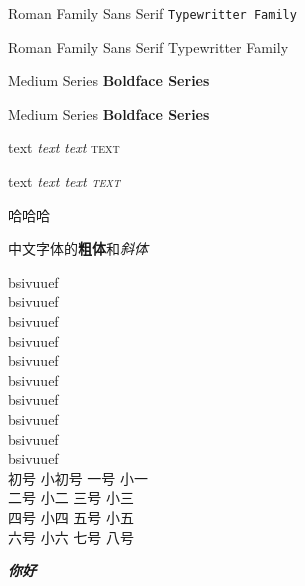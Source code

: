 \documentclass{article}
\newcommand{\mytextfont}{\textit{\textbf{\textsf{\zihao{3}你好}}}}
\begin{document}
	\textrm{Roman Family}	\textsf{Sans Serif}	\texttt{Typewritter Family}	%
	
	\rmfamily Roman Family	\sffamily Sans Serif	\ttfamily Typewritter Family	%
	
	
	\textmd{Medium Series}	\textbf{Boldface Series}
	
	\mdseries Medium Series	\bfseries Boldface Series
	
	
	\textup{text}	\textit{text}	\textsl{text}	\textsc{text}
	
	\upshape text	\itshape text	\slshape text	\scshape text
	
	{\songti 哈哈哈}
	
	中文字体的\textbf{粗体}和\textit{斜体}
	
	{\tiny    bsivuuef}\\
	{\scriptsize    bsivuuef}\\
	{\footnotesize    bsivuuef}\\
	{\small    bsivuuef}\\
	{\normalsize   bsivuuef}\\
	{\large		bsivuuef}\\
	{\Large    bsivuuef}\\
	{\LARGE   bsivuuef}\\
	{\huge    bsivuuef}\\
	{\Huge    bsivuuef}\\
	
	 初号 \quad {} 小初号 \quad {} 一号 \quad {} 小一\\
	 二号 \quad {} 小二 \quad {} 三号 \quad {} 小三\\
	 四号 \quad {} 小四 \quad {} 五号 \quad {} 小五\\
	 六号 \quad {} 小六 \quad {} 七号 \quad {} 八号
	
	
	\mytextfont
\end{document}
